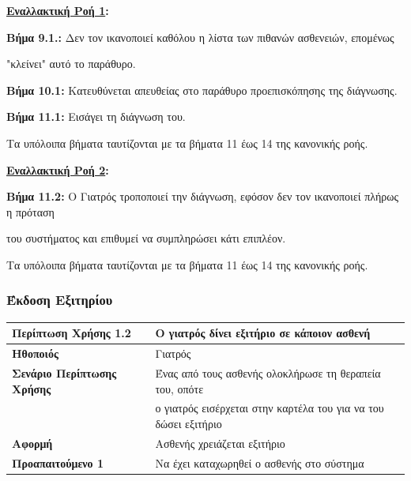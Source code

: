 \documentclass{article}
\newcommand\T{\rule{0pt}{2.6ex}}       %
\newcommand\B{\rule[-1.2ex]{0pt}{0pt}}
\begin{document}
  \textbf{\underline{Εναλλακτική Ροή 1}:}  \vspace{0.2cm}
\par \textbf{Βήμα 9.1.:} Δεν τον ικανοποιεί καθόλου η λίστα των πιθανών ασθενειών, επομένως \par "κλείνει" αυτό το παράθυρο. \vspace{0.1cm}
\par \textbf{Βήμα 10.1:} Κατευθύνεται απευθείας στο παράθυρο προεπισκόπησης της διάγνωσης. \vspace{0.1cm}
\par \textbf{Βήμα 11.1:} Εισάγει τη διάγνωση του. \vspace{0.1cm}

\par Τα υπόλοιπα βήματα ταυτίζονται με τα βήματα 11 έως 14 της κανονικής ροής.

\vspace{0.2cm}

\textbf{\underline{Εναλλακτική Ροή 2}:}  \vspace{0.2cm}
\par \textbf{Βήμα 11.2:} Ο Γιατρός τροποποιεί την διάγνωση, εφόσον δεν τον ικανοποιεί πλήρως η πρόταση \par του συστήματος και επιθυμεί να συμπληρώσει κάτι επιπλέον. \vspace{0.1cm}

\par Τα υπόλοιπα βήματα ταυτίζονται με τα βήματα 11 έως 14 της κανονικής ροής.\vspace{0.1cm}

\newpage

 \subsubsection{Έκδοση Εξιτηρίου}
 
 \begin{center}
     \begin{tabular}{|l|l|}
     \hline
      \textbf{Περίπτωση Χρήσης 1.2} & Ο γιατρός δίνει εξιτήριο σε κάποιον ασθενή \T\B \\ 
      \hline
      \textbf{Ηθοποιός} & Γιατρός \T\B \\
      \hline
      \textbf{Σενάριο Περίπτωσης Χρήσης} & Ένας από τους ασθενής ολοκλήρωσε τη θεραπεία του, οπότε \T\\& ο γιατρός εισέρχεται στην καρτέλα του για να του δώσει εξιτήριο \B \\
      \hline
      \textbf{Αφορμή} & Ασθενής χρειάζεται εξιτήριο \T\B \\
      \hline
      \textbf{Προαπαιτούμενο 1} & Να έχει καταχωρηθεί ο ασθενής στο σύστημα \T\B \\
      \hline
     \end{tabular}
 \end{center}
 
\end{document}
